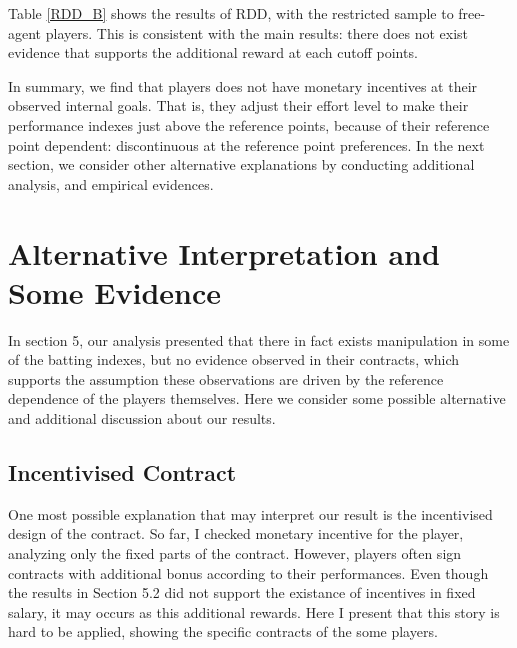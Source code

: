 \documentclass[dvipdfmx, 12pt]{article}
\begin{document}
Table \ref{RDD_B} shows the results of RDD, with the restricted sample to free-agent players. This is consistent with the main results: there does not exist evidence that supports the additional reward at each cutoff points.

In summary, we find that players does not have monetary incentives at their observed internal goals. That is, they adjust their effort level to make their performance indexes just above the reference points, because of their reference point dependent: discontinuous at the reference point preferences. In the next section, we consider other alternative explanations by conducting additional analysis, and empirical evidences.

\section{Alternative Interpretation and Some Evidence}

In section 5, our analysis presented that there in fact exists manipulation in some of the batting indexes, but no evidence observed in their contracts, which supports the assumption these observations are driven by the reference dependence of the players themselves. Here we consider some possible alternative and additional discussion about our results.

\subsection{Incentivised Contract}

One most possible explanation that may interpret our result is the incentivised design of the contract. So far, I checked monetary incentive for the player, analyzing only the fixed parts of the contract. However, players often sign contracts with additional bonus according to their performances. Even though the results in Section 5.2 did not support the existance of incentives in fixed salary, it may occurs as this additional rewards. Here I present that this story is hard to be applied, showing the specific contracts of the some players.
\end{document}
